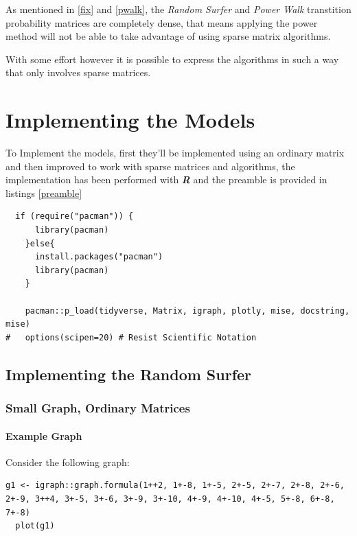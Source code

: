 \documentclass[11pt]{article}
\begin{document}
As mentioned in \ref{fix} and \ref{pwalk}, the \emph{Random Surfer} and \emph{Power Walk}
transtition probability matrices are completely dense, that means applying the
power method will not be able to take advantage of using sparse matrix
algorithms.

With some effort however it is possible to express the algorithms in such a way that only involves sparse matrices.

\section{Implementing the Models}
\label{sec:orgc483064}
To Implement the models, first they'll be implemented using an ordinary matrix and then improved to work with sparse matrices and algorithms, the implementation has been performed with \emph{\textbf{R}} and the preamble is provided in listings \ref{preamble}

\begin{lstlisting}
  if (require("pacman")) {
      library(pacman)
    }else{
      install.packages("pacman")
      library(pacman)
    }

    pacman::p_load(tidyverse, Matrix, igraph, plotly, mise, docstring, mise)
#   options(scipen=20) # Resist Scientific Notation
\end{lstlisting}

\subsection{Implementing the Random Surfer}
\label{sec:org292f7c0}
\subsubsection{Small Graph, Ordinary Matrices}
\label{implementing-page-rank-methods}
\paragraph{Example Graph}
\label{example-graph}
Consider the following graph:

\lstset{language=r,label= ,caption= ,captionpos=b,numbers=none}
\begin{lstlisting}
g1 <- igraph::graph.formula(1++2, 1+-8, 1+-5, 2+-5, 2+-7, 2+-8, 2+-6, 2+-9, 3++4, 3+-5, 3+-6, 3+-9, 3+-10, 4+-9, 4+-10, 4+-5, 5+-8, 6+-8, 7+-8)
  plot(g1)
\end{lstlisting}
\end{document}
